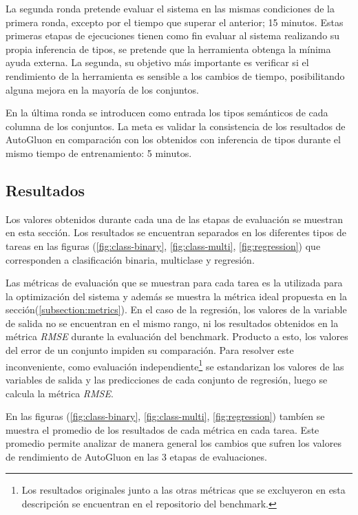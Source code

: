   La segunda ronda pretende evaluar el sistema en las mismas condiciones de la primera ronda, excepto por el tiempo que superar el anterior; 15 minutos.
  Estas primeras etapas de ejecuciones tienen como fin evaluar al sistema realizando su propia inferencia de tipos, se pretende que la herramienta obtenga la mínima
  ayuda externa. La segunda, su objetivo más importante es verificar si el rendimiento de la herramienta es sensible a los cambios de tiempo, posibilitando alguna 
  mejora en la mayoría de los conjuntos.
  
  En la última ronda se introducen como entrada los tipos semánticos de cada columna de los conjuntos. La meta es validar la consistencia de los resultados de 
  AutoGluon en comparación con los obtenidos con inferencia de tipos durante el mismo tiempo de entrenamiento: 5 minutos. 

\subsection{Resultados}\label{subsection:results}

Los valores obtenidos durante cada una de las etapas de evaluación se muestran en esta sección. Los resultados se encuentran separados en los diferentes tipos de tareas
en las figuras (\ref{fig:class-binary}, \ref{fig:class-multi}, \ref{fig:regression}) que corresponden a clasificación binaria, multiclase y regresión.  

Las métricas de evaluación que se muestran para cada tarea es la utilizada para la optimización del sistema y además se muestra la métrica ideal propuesta en la 
sección(\ref{subsection:metrics}).
En el caso de la regresión, los valores de la variable de salida no se encuentran en el mismo rango, ni los resultados obtenidos en la métrica \textit{RMSE} 
durante la evaluación del benchmark. Producto a esto, los valores del error de un conjunto impiden su comparación. Para resolver este inconveniente,
como evaluación independiente\footnote{Los resultados originales junto a las otras métricas que se excluyeron en esta descripción se encuentran en el repositorio del 
benchmark.} se estandarizan los valores de las variables de salida y las predicciones de cada conjunto de regresión, luego se calcula la métrica 
\textit{RMSE}.

En las figuras (\ref{fig:class-binary}, \ref{fig:class-multi}, \ref{fig:regression}) tambíen se muestra el promedio de los resultados de cada métrica en cada tarea. 
Este promedio permite analizar de manera general los cambios que sufren los valores de rendimiento de AutoGluon en las 3 etapas de evaluaciones.

